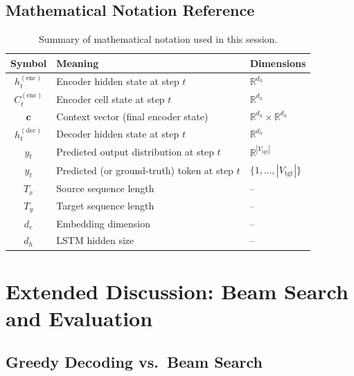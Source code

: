 \documentclass[12pt,a4paper]{article}
\begin{document}
\subsection{Mathematical Notation Reference}

\begin{table}[htbp]
  \centering
  \caption{Summary of mathematical notation used in this session.}
  \label{tab:notation}
  \begin{tabular}{@{}cll@{}}
    \toprule
    \textbf{Symbol} & \textbf{Meaning} & \textbf{Dimensions} \\
    \midrule
    $h_t^{(\text{enc})}$ & Encoder hidden state at step $t$ & $\mathbb{R}^{d_h}$ \\
    $C_t^{(\text{enc})}$ & Encoder cell state at step $t$ & $\mathbb{R}^{d_h}$ \\
    $\mathbf{c}$         & Context vector (final encoder state) & $\mathbb{R}^{d_h} \times \mathbb{R}^{d_h}$ \\
    $h_t^{(\text{dec})}$ & Decoder hidden state at step $t$ & $\mathbb{R}^{d_h}$ \\
    $\hat{y}_t$          & Predicted output distribution at step $t$ & $\mathbb{R}^{|V_{\text{tgt}}|}$ \\
    $y_t$                & Predicted (or ground-truth) token at step $t$ & $\{1, \ldots, |V_{\text{tgt}}|\}$ \\
    $T_x$                & Source sequence length & -- \\
    $T_y$                & Target sequence length & -- \\
    $d_e$                & Embedding dimension & -- \\
    $d_h$                & LSTM hidden size & -- \\
    \bottomrule
  \end{tabular}
\end{table}

\section{Extended Discussion: Beam Search and Evaluation}
\label{sec:beam_search}

\subsection{Greedy Decoding vs.\ Beam Search}
\end{document}
